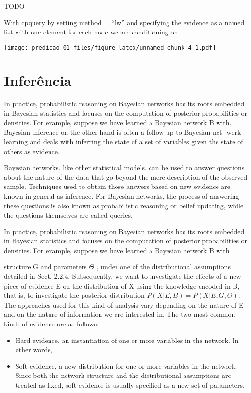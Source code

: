 \documentclass[
]{article}
\begin{document}
TODO

With cpquery by setting method = ``lw'' and specifying the evidence as a
named list with one element for each node we are conditioning on

\texttt{[image: predicao-01\_files/figure-latex/unnamed-chunk-4-1.pdf]}

\hypertarget{inferuxeancia}{%
\section{Inferência}\label{inferuxeancia}}

In practice, probabilistic reasoning on Bayesian networks has its roots
embedded in Bayesian statistics and focuses on the computation of
posterior probabilities or densities. For example, suppose we have
learned a Bayesian network B with. Bayesian inference on the other hand
is often a follow-up to Bayesian net- work learning and deals with
inferring the state of a set of variables given the state of others as
evidence.

Bayesian networks, like other statistical models, can be used to answer
questions about the nature of the data that go beyond the mere
description of the observed sample. Techniques used to obtain those
answers based on new evidence are known in general as inference. For
Bayesian networks, the process of answering these questions is also
known as probabilistic reasoning or belief updating, while the questions
themselves are called queries.

In practice, probabilistic reasoning on Bayesian networks has its roots
embedded in Bayesian statistics and focuses on the computation of
posterior probabilities or densities. For example, suppose we have
learned a Bayesian network B with

structure G and parameters \(\Theta\) , under one of the distributional
assumptions detailed in Sect. 2.2.4. Subsequently, we want to
investigate the effects of a new piece of evidence E on the distribution
of X using the knowledge encoded in B, that is, to investigate the
posterior distribution \(P(X | E, B) = P(X | E, G, \Theta )\). The
approaches used for this kind of analysis vary depending on the nature
of E and on the nature of information we are interested in. The two most
common kinds of evidence are as follows:

\begin{itemize}
\item
  Hard evidence, an instantiation of one or more variables in the
  network. In other words,
\item
  Soft evidence, a new distribution for one or more variables in the
  network. Since both the network structure and the distributional
  assumptions are treated as fixed, soft evidence is usually specified
  as a new set of parameters,
\end{itemize}
\end{document}

